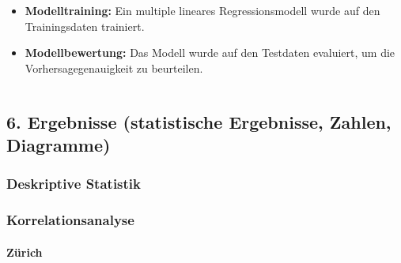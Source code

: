 \documentclass[
  journal,
]{IEEEtran}%
\let\oldparagraph\paragraph
\renewcommand{\paragraph}[1]{\oldparagraph{#1}\mbox{}}
\begin{document}
\begin{itemize}
\item
  \textbf{Modelltraining:} Ein multiple lineares Regressionsmodell wurde
  auf den Trainingsdaten trainiert.
\item
  \textbf{Modellbewertung:} Das Modell wurde auf den Testdaten
  evaluiert, um die Vorhersagegenauigkeit zu beurteilen.
\end{itemize}

\begin{verbatim}
\end{verbatim}

\hypertarget{ergebnisse-statistische-ergebnisse-zahlen-diagramme}{%
\subsection{6. Ergebnisse (statistische Ergebnisse, Zahlen,
Diagramme)}\label{ergebnisse-statistische-ergebnisse-zahlen-diagramme}}

\hypertarget{deskriptive-statistik-1}{%
\subsubsection{\texorpdfstring{\textbf{Deskriptive
Statistik}}{Deskriptive Statistik}}\label{deskriptive-statistik-1}}

\hypertarget{korrelationsanalyse-1}{%
\subsubsection{\texorpdfstring{\textbf{Korrelationsanalyse}}{Korrelationsanalyse}}\label{korrelationsanalyse-1}}

\hypertarget{zuxfcrich}{%
\paragraph{Zürich}\label{zuxfcrich}}
\end{document}
